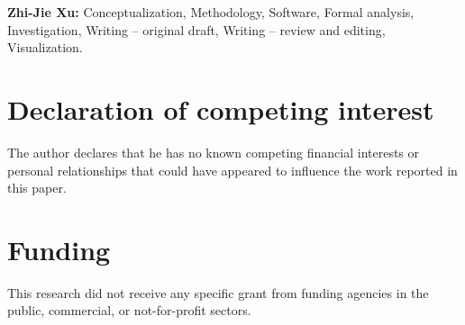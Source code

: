 \documentclass[11pt]{article}
\theoremstyle{definition}
\theoremstyle{remark}
\begin{document}
\textbf{Zhi-Jie Xu:} Conceptualization, Methodology, Software, Formal
analysis, Investigation, Writing -- original draft, Writing -- review and
editing, Visualization.

\section*{Declaration of competing interest}

The author declares that he has no known competing financial interests or
personal relationships that could have appeared to influence the work reported
in this paper.

\section*{Funding}

This research did not receive any specific grant from funding agencies in the
public, commercial, or not-for-profit sectors.



\end{document}
